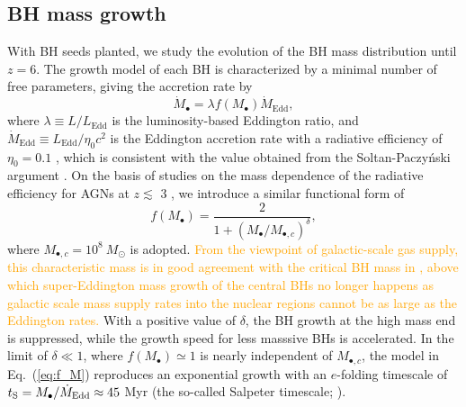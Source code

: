 \documentclass[twocolumn, twocolappendix]{aastex63}
\newcommand{\Msun}{M_\odot}
\newcommand{\Mbh}{M_\bullet}
\newcommand{\Mdot}{\dot{M}}
\newcommand{\orange}[1]{\textcolor{orange}{ #1}}
\begin{document}
\begin{CJK*}{UTF8}{gbsn}
\subsection{BH mass growth}
\label{sec:model}
With BH seeds planted, we study the evolution of the BH mass distribution until $z=6$. 
The growth model of each BH is characterized by a minimal number of free parameters, 
giving the accretion rate by
%
\begin{equation}
  \label{eq:mdot}
  \Mdot_\bullet = \lambda f(\Mbh) \Mdot_\mathrm{Edd} ,
\end{equation}
where $\lambda \equiv L/L_\mathrm{Edd}$ is the luminosity-based Eddington ratio,
and $\Mdot_\mathrm{Edd} \equiv L_{\mathrm{Edd}}/\eta_0 c^2$ is the Eddington accretion rate with a radiative efficiency of $\eta_0=0.1$ \citep{1973A&A....24..337S},
which is consistent with the value obtained from the Soltan-Paczy{\'n}ski argument \citep[e.g.,][]{2002MNRAS.335..965Y,2010ApJ...725..388C}.
On the basis of studies on the mass dependence of the radiative efficiency for AGNs at $z\lesssim$ 3 
\citep{2008MNRAS.390..561C,2012ApJ...749..187L,2014ApJ...786..104U}, 
we introduce a similar functional form of
%
\begin{equation}
\label{eq:f_M}
f(\Mbh) = \frac{2}{1+\left(\Mbh /M_{\bullet,c} \right)^\delta}, 
\end{equation}
%
where $M_{\bullet,c}=10^8~\Msun$ is adopted.
\orange{
From the viewpoint of galactic-scale gas supply,
this characteristic mass is in good agreement with the critical BH mass in \citet{2021ApJ...907...74T},
above which super-Eddington mass growth of the central BHs no longer happens as
galactic scale mass supply rates into the nuclear regions cannot be as large as the Eddington rates.
}
With a positive value of $\delta$, the BH growth at the high mass end is suppressed,
while the growth speed for less masssive BHs is accelerated.
In the limit of $\delta \ll 1$, where $f(\Mbh) \simeq 1$ is nearly independent of $M_{\bullet,c}$,
the model in Eq.~(\ref{eq:f_M}) reproduces an exponential growth with an $e$-folding timescale of
$t_{\rm S} =  \Mbh/\Mdot_{\mathrm{Edd}} \approx 45$ Myr (the so-called Salpeter timescale; \citealt{1964ApJ...140..796S}).



\end{CJK*}
\end{document}
